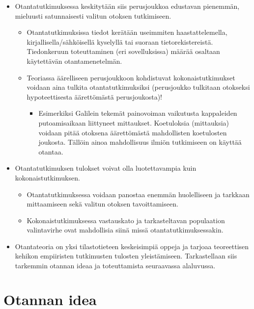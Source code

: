 \documentclass[
]{book}
\providecommand{\tightlist}{%
  \setlength{\itemsep}{0pt}\setlength{\parskip}{0pt}}
\begin{document}
\begin{itemize}
\tightlist
\item
  Otantatutkimuksessa keskitytään siis perusjoukkoa edustavan pienemmän, mieluusti satunnaisesti valitun otoksen tutkimiseen.

  \begin{itemize}
  \tightlist
  \item
    Otantatutkimuksissa tiedot kerätään useimmiten haastattelemella, kirjallisella/sähköisellä kyselyllä tai suoraan tietorekistereistä. Tiedonkeruun toteuttaminen (eri sovelluksissa) määrää osaltaan käytettävän otantamenetelmän.
  \item
    Teoriassa äärelliseen perusjoukkoon kohdistuvat kokonaistutkimukset voidaan aina tulkita otantatutkimuksiksi (perusjoukko tulkitaan otokseksi hypoteettisesta äärettömästä perusjoukosta)!

    \begin{itemize}
    \tightlist
    \item
      Esimerkiksi Galilein tekemät painovoiman vaikutusta kappaleiden putoamisaikaan liittyneet mittaukset. Koetuloksia (mittauksia) voidaan pitää otoksena äärettömästä mahdollisten koetulosten joukosta. Tällöin ainoa mahdollisuus ilmiön tutkimiseen on käyttää otantaa.
    \end{itemize}
  \end{itemize}
\item
  Otantatutkimuksen tulokset voivat olla luotettavampia kuin kokonaistutkimuksen.

  \begin{itemize}
  \tightlist
  \item
    Otantatutkimuksessa voidaan panostaa enemmän huolelliseen ja tarkkaan mittaamiseen sekä valitun otoksen tavoittamiseen.
  \item
    Kokonaistutkimuksessa vastauskato ja tarkasteltavan populaation valintavirhe ovat mahdollisia siinä missä otantatutkimuksessakin.
  \end{itemize}
\item
  Otantateoria on yksi tilastotieteen keskeisimpiä oppeja ja tarjoaa teoreettisen kehikon empiiristen tutkimusten tulosten yleistämiseen. Tarkastellaan siis tarkemmin otannan ideaa ja toteuttamista seuraavassa alaluvussa.
\end{itemize}

\hypertarget{alaluku52}{%
\section{Otannan idea}\label{alaluku52}}
\end{document}

